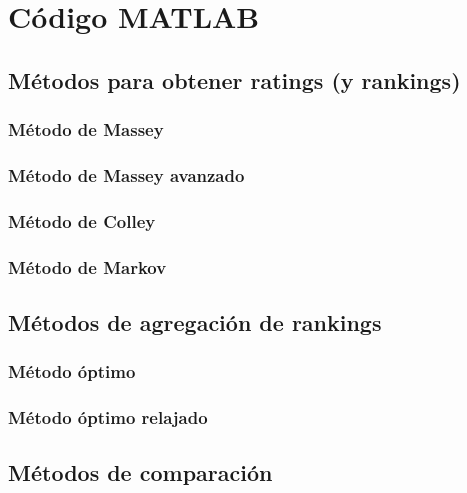 \chapter{Código MATLAB}

\section{Métodos para obtener ratings (y rankings)}

\subsection*{Método de Massey}



\subsection*{Método de Massey avanzado}

\subsection*{Método de Colley}



\subsection*{Método de Markov}



\section{Métodos de agregación de rankings}

\subsection*{Método óptimo}



\subsection*{Método óptimo relajado}



\section{Métodos de comparación}


